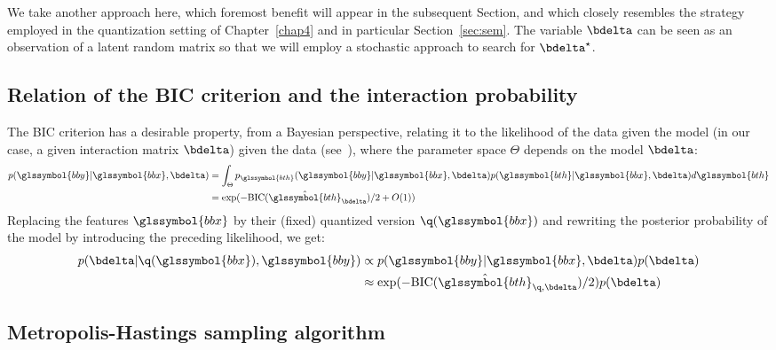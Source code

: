We take another approach here, which foremost benefit will appear in the subsequent Section, and which closely resembles the strategy employed in the quantization setting of Chapter~\ref{chap4} and in particular Section~\ref{sec:sem}. The variable $\bdelta$ can be seen as an observation of a latent random matrix so that we will employ a stochastic approach to search for $\bdelta^\star$.

\subsection{Relation of the BIC criterion and the interaction probability}

The BIC criterion has a desirable property, from a Bayesian perspective, relating it to the likelihood of the data given the model (in our case, a given interaction matrix $\bdelta$) given the data (see~\cite{lebarbier}), where the parameter space $\Theta$ depends on the model $\bdelta$:
\begin{align*}
p(\glssymbol{bby} | \glssymbol{bbx}, \bdelta) & = \int_{\Theta} p_{\glssymbol{bth}}(\glssymbol{bby} | \glssymbol{bbx}, \bdelta) p(\glssymbol{bth} | \glssymbol{bbx}, \bdelta)d\glssymbol{bth} \\
& = \exp(-\text{BIC}(\hat{\glssymbol{bth}}_{\bdelta})/2 + O(1))
\end{align*}
Replacing the features $\glssymbol{bbx}$ by their (fixed) quantized version $\q(\glssymbol{bbx})$ and rewriting the posterior probability of the model by introducing the preceding likelihood, we get:
\begin{align*}
p(\bdelta | \q(\glssymbol{bbx}),\glssymbol{bby}) & \propto p(\glssymbol{bby} | \glssymbol{bbx}, \bdelta) p(\bdelta) \\
& \approx \exp(-\text{BIC}(\hat{\glssymbol{bth}}_{\q,\bdelta})/2) p(\bdelta)
\end{align*}

\subsection{Metropolis-Hastings sampling algorithm}

